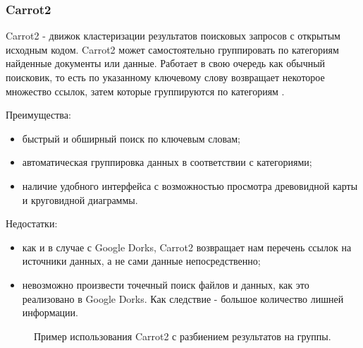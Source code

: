 \subsubsection{Carrot2}
Carrot2 - движок кластеризации результатов поисковых запросов с открытым исходным кодом. Carrot2 может самостоятельно
группировать по категориям найденные документы или данные. Работает в свою очередь как обычный поисковик, то есть
по указанному ключевому слову возвращает некоторое множество ссылок, затем которые группируются по категориям 
\cite{carrot2wikipedia}.

\par
Преимущества:
\begin{itemize}
    \item быстрый и обширный поиск по ключевым словам;
    \item автоматическая группировка данных в соответствии с категориями;
    \item наличие удобного интерфейса с возможностью просмотра древовидной карты и круговидной диаграммы.
\end{itemize}

\par
Недостатки:
\begin{itemize}
    \item как и в случае с Google Dorks, Carrot2 возвращает нам перечень ссылок на источники данных, а не сами данные
     непосредственно;
    \item невозможно произвести точечный поиск файлов и данных, как это реализовано в Google Dorks. Как следствие - 
    большое количество лишней информации.
\end{itemize}


\begin{figure}[H]
    \caption{Пример использования Carrot2 с разбиением результатов на группы.}
    \label{ris:image}
\end{figure}


